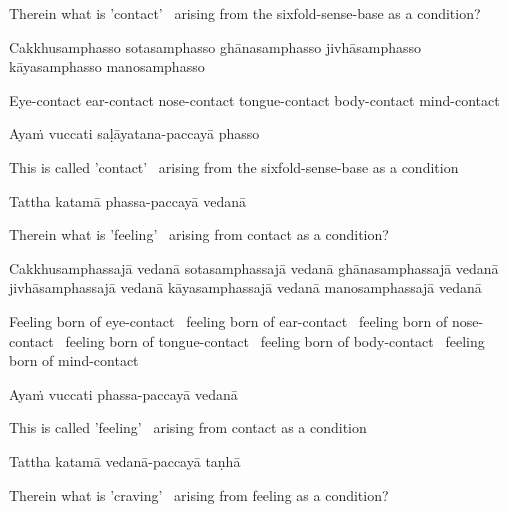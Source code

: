 \begin{english-hang}
  Therein what is 'contact' \breathmark\ arising from the sixfold-sense-base as a condition?
\end{english-hang}

\begin{pali-hang}
  Cakkhusamphasso sotasamphasso ghānasamphasso jivhāsamphasso kāyasamphasso manosamphasso
\end{pali-hang}

\begin{english-hang}
  Eye-contact ear-contact nose-contact tongue-contact body-contact mind-contact
\end{english-hang}

Ayaṁ vuccati saḷāyatana-paccayā phasso

\begin{english-hang}
  This is called 'contact' \breathmark\ arising from the sixfold-sense-base as a condition
\end{english-hang}

Tattha katamā phassa-paccayā vedanā

\begin{english}
  Therein what is 'feeling' \breathmark\ arising from contact as a condition?
\end{english}

\begin{pali-hang}
  Cakkhusamphassajā vedanā sotasamphassajā vedanā ghānasamphassajā vedanā jivhāsamphassajā vedanā kāyasamphassajā vedanā manosamphassajā vedanā
\end{pali-hang}

\begin{english-hang-verses}
  Feeling born of eye-contact \breathmark\ feeling born of ear-contact \breathmark\
  feeling born of nose-contact \breathmark\ feeling born of tongue-contact \breathmark\ feeling born of body-contact \breathmark\ feeling born of mind-contact
\end{english-hang-verses}

Ayaṁ vuccati phassa-paccayā vedanā

\begin{english}
  This is called 'feeling' \breathmark\ arising from contact as a condition
\end{english}

Tattha katamā vedanā-paccayā taṇhā

\begin{english}
  Therein what is 'craving' \breathmark\ arising from feeling as a condition?
\end{english}

